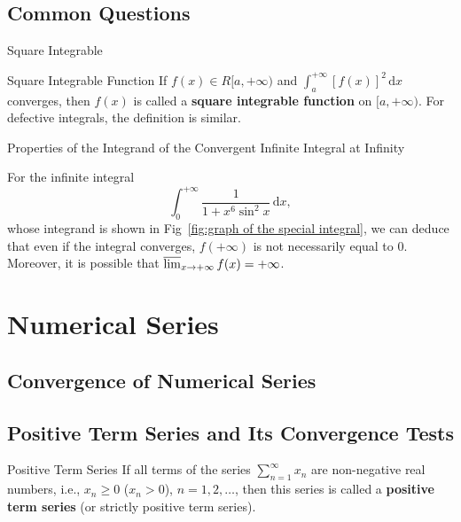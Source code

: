 \documentclass[11pt]{../../TexTemplate/elegantbook}
\begin{document}
\section{Common Questions}
\begin{leftbarTitle}{Square Integrable}\end{leftbarTitle}
\begin{definition}{Square Integrable Function}
    If \( f(x) \in R[a, +\infty) \) and \( \int_{a}^{+\infty} [f(x)]^2 \, \mathrm{d}x \) converges, 
    then \( f(x) \) is called a \textbf{square integrable function} on \( [a, +\infty) \).
    For defective integrals, the definition is similar.
\end{definition}

\begin{property}
    
\end{property}

\begin{leftbarTitle}{Properties of the Integrand of the Convergent Infinite Integral at Infinity}\end{leftbarTitle}
For the infinite integral
\[
\int_{0}^{+\infty} \frac{1}{1 + x^6 \sin^2 x} \, \mathrm{d}x,
\]
whose integrand is shown in Fig~\ref{fig:graph of the special integral}, 
we can deduce that even if the integral converges, \(f(+\infty)\) is not necessarily equal to \(0\). 
Moreover, it is possible that \(\varlimsup_{x \to +\infty} f(x) = +\infty\).

\chapter{Numerical Series}
\section{Convergence of Numerical Series}

\section{Positive Term Series and Its Convergence Tests}
\begin{definition}{Positive Term Series}
    If all terms of the series \( \sum_{n=1}^{\infty} x_n \) are non-negative real numbers, 
    i.e., \( x_n \geqslant 0 \) (\( x_n > 0 \)), \( n = 1, 2, \dots \), 
    then this series is called a \textbf{positive term series} (or strictly positive term series).
\end{definition}
\end{document}

